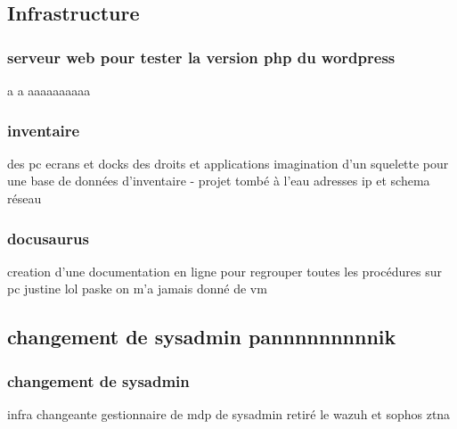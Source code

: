 \subsection{Infrastructure}
\subsubsection{serveur web pour tester la version php du wordpress}
a   a   aaaaaaaaaa
\subsubsection{inventaire}
des pc ecrans et docks
des droits et applications
imagination d'un squelette pour une base de données d'inventaire - projet tombé à l'eau
adresses ip et schema réseau
\subsubsection{docusaurus}
creation d'une documentation en ligne pour regrouper toutes les procédures
sur pc justine lol paske on m'a jamais donné de vm

\subsection{changement de sysadmin pannnnnnnnnik}
\subsubsection{changement de sysadmin}
infra changeante
gestionnaire de mdp de sysadmin
retiré le wazuh et sophos ztna

